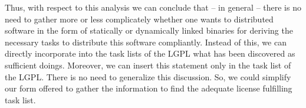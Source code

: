 Thus, with respect to this analysis we can conclude that -- in general -- there
is no need to gather more or less complicately whether one wants to distributed
software in the form of statically or dynamically linked binaries for deriving
the necessary tasks to distribute this software compliantly. Instead of this, we
can directly incorporate into the task lists of the LGPL what has been
discovered as sufficient doings. Moreover, we can insert this statement only in
the task list of the LGPL. There is no need to generalize this discussion. So,
we could simplify our form offered to gather the information to find the
adequate license fulfilling task list.


%
